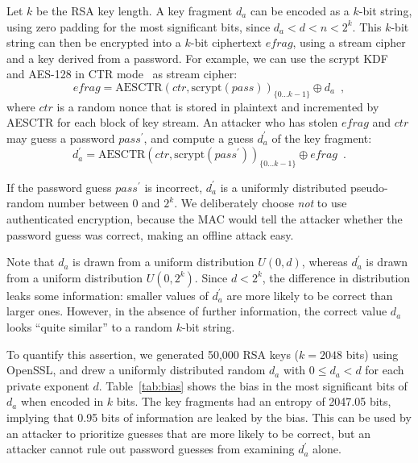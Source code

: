 \documentclass{llncs}
\begin{document}
Let $k$ be the RSA key length. A key fragment $d_a$ can be encoded as a $k$-bit string, using zero
padding for the most significant bits, since $d_a < d < n < 2^k$. This $k$-bit string can then be
encrypted into a $k$-bit ciphertext $\mathit{efrag}$, using a stream cipher and a key derived from a
password. For example, we can use the scrypt KDF~\cite{Percival09} and AES-128 in CTR
mode~\cite{Lipmaa00} as stream cipher:
\begin{equation}\label{eq:encrypt}
\mathit{efrag} =
    \mathrm{AESCTR}(\mathit{ctr}, \mathrm{scrypt}(\mathit{pass}))_{\{0 \dots k-1\}} \oplus d_a
    \enspace,
\end{equation}
where $\mathit{ctr}$ is a random nonce that is stored in plaintext and incremented by AESCTR for
each block of key stream. An attacker who has stolen $\mathit{efrag}$ and $\mathit{ctr}$ may guess a
password $\mathit{pass}^\prime$, and compute a guess $d_a^\prime$ of the key fragment:
\begin{equation}\label{eq:decrypt}
d_a^\prime =
    \mathrm{AESCTR}(\mathit{ctr}, \mathrm{scrypt}(\mathit{pass}^\prime))_{\{0 \dots k-1\}} \oplus \mathit{efrag}
    \enspace.
\end{equation}

If the password guess $\mathit{pass}^\prime$ is incorrect, $d_a^\prime$ is a uniformly distributed
pseudo-random number between 0 and $2^k$. We deliberately choose \emph{not} to use authenticated
encryption, because the MAC would tell the attacker whether the password guess was correct, making
an offline attack easy.

Note that $d_a$ is drawn from a uniform distribution $U(0, d)$, whereas $d_a^\prime$ is drawn from a
uniform distribution $U(0, 2^k)$. Since $d < 2^k$, the difference in distribution leaks some
information: smaller values of $d_a^\prime$ are more likely to be correct than larger ones. However,
in the absence of further information, the correct value $d_a$ looks ``quite similar'' to a random
$k$-bit string.

To quantify this assertion, we generated 50,000 RSA keys ($k=2048$ bits) using OpenSSL, and drew a
uniformly distributed random $d_a$ with $0 \le d_a < d$ for each private exponent $d$.
Table~\ref{tab:bias} shows the bias in the most significant bits of $d_a$ when encoded in $k$ bits.
The key fragments had an entropy of 2047.05 bits, implying that 0.95 bits of information are leaked
by the bias. This can be used by an attacker to prioritize guesses that are more likely to be
correct, but an attacker cannot rule out password guesses from examining $d_a^\prime$ alone.
\end{document}
